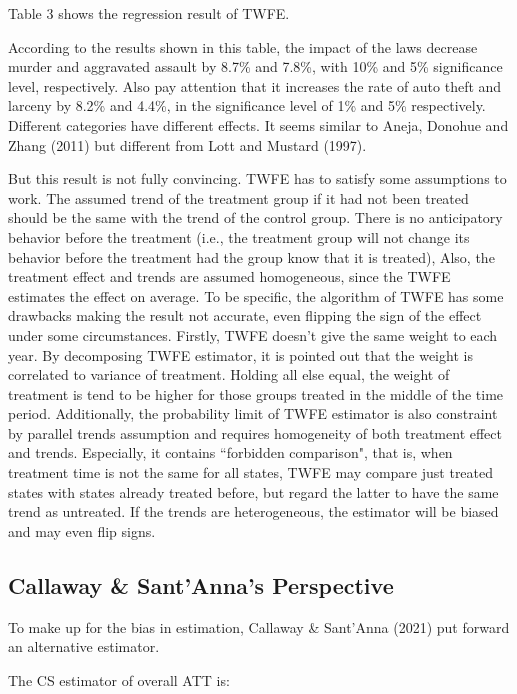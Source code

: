 \documentclass{article}
\begin{document}
Table 3 shows the regression result of TWFE. 



According to the results shown in this table, the impact of the laws decrease murder and aggravated assault by 8.7\% and 7.8\%, with 10\% and 5\% significance level, respectively. Also pay attention that it increases the rate of auto theft and larceny by 8.2\% and 4.4\%, in the significance level of 1\% and 5\% respectively. Different categories have different effects. It seems similar to Aneja, Donohue and Zhang (2011) but different from Lott and Mustard (1997).

But this result is not fully convincing. TWFE has to satisfy some assumptions to work. The assumed trend of the treatment group if it had not been treated should be the same with the trend of the control group. There is no anticipatory behavior before the treatment (i.e., the treatment group will not change its behavior before the treatment had the group know that it is treated), Also, the treatment effect and trends are assumed homogeneous, since the TWFE estimates the effect on average. To be specific, the algorithm of TWFE has some drawbacks making the result not accurate, even flipping the sign of the effect under some circumstances. Firstly, TWFE doesn't give the same weight to each year. By decomposing TWFE estimator, it is pointed out that the weight is correlated to variance of treatment. Holding all else equal, the weight of treatment is tend to be higher for those groups treated in the middle of the time period. Additionally, the probability limit of TWFE estimator is also constraint by parallel trends assumption and requires homogeneity of both treatment effect and trends. Especially, it contains ``forbidden comparison", that is, when treatment time is not the same for all states, TWFE may compare just treated states with states already treated before, but regard the latter to have the same trend as untreated. If the trends are heterogeneous, the estimator will be biased and may even flip signs.

\subsection{Callaway \& Sant'Anna's Perspective}

To make up for the bias in estimation, Callaway \& Sant'Anna (2021) put forward an alternative estimator.

The CS estimator of overall ATT is:
\end{document}
